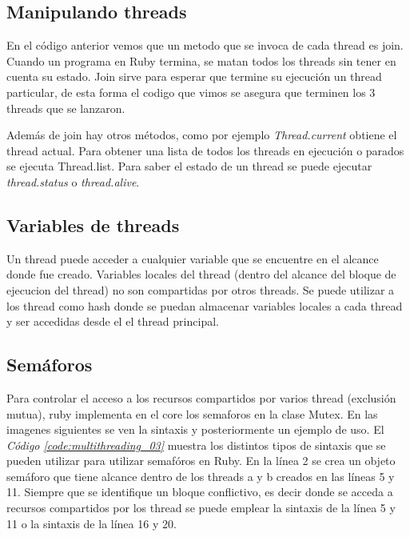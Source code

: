 \documentclass{article}
\newcommand{\refcode}[1]{\textit{Código \ref{#1}}}
\begin{document}
\subsection{Manipulando threads}

	En el código anterior vemos que un metodo que se invoca de cada thread es join. Cuando un programa en Ruby termina, se matan todos los threads sin tener en cuenta su estado. Join sirve para esperar que termine su ejecución un thread particular, de esta forma el codigo que vimos se asegura que terminen los 3 threads que se lanzaron.
	\par
	Además de join hay otros métodos, como por ejemplo \textit{Thread.current} obtiene el thread actual. Para obtener una lista de todos los threads en ejecución o parados se ejecuta Thread.list. Para saber el estado de un thread se puede ejecutar \textit{thread.status} o \textit{thread.alive}.
\bigskip



\subsection{Variables de threads}
Un thread puede acceder a cualquier variable que se encuentre en el alcance donde fue creado. Variables locales del thread (dentro del alcance del bloque de ejecucion del thread) no son compartidas por otros threads. Se puede utilizar a los thread como hash donde se puedan almacenar variables locales a cada thread y ser accedidas desde el el thread principal.

 
\bigskip



\subsection{Semáforos}

Para controlar el acceso a los recursos compartidos por varios thread (exclusión mutua), ruby implementa en el core los semaforos en la clase Mutex. En las imagenes siguientes se ven la sintaxis y posteriormente un ejemplo de uso.
El \refcode{code:multithreading_03} muestra los distintos tipos de sintaxis que se pueden utilizar para utilizar semafóros en Ruby. En la línea 2 se crea un objeto semáforo que tiene alcance dentro de los threads a y b creados en las líneas 5 y 11. Siempre que se identifique un bloque conflictivo, es decir donde se acceda a recursos compartidos por los thread se puede emplear la sintaxis de la línea 5 y 11 o la sintaxis de la línea  16 y 20.
 
\bigskip
\end{document}
